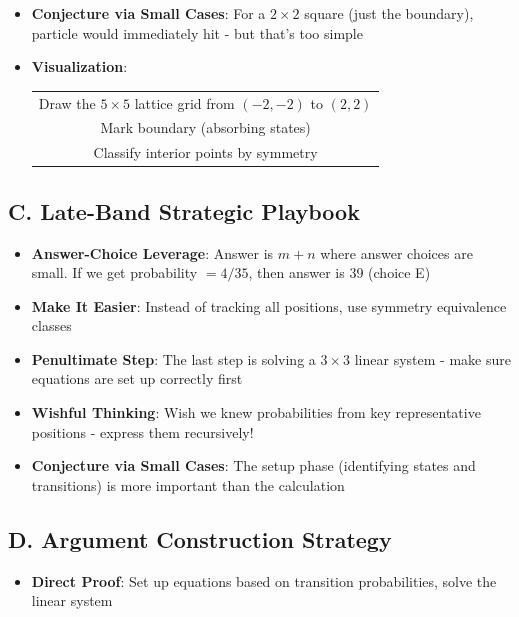 \documentclass[12pt]{article}
\begin{document}
\begin{strategicbox}
\begin{itemize}[leftmargin=*]
    \item \textbf{Conjecture via Small Cases}: For a $2 \times 2$ square (just the boundary), particle would immediately hit - but that's too simple
    
    \item \textbf{Visualization}: 
    \begin{center}
    \begin{tabular}{c}
    Draw the $5 \times 5$ lattice grid from $(-2,-2)$ to $(2,2)$ \\
    Mark boundary (absorbing states) \\
    Classify interior points by symmetry
    \end{tabular}
    \end{center}
\end{itemize}

\subsection*{C. Late-Band Strategic Playbook}
\begin{itemize}[leftmargin=*]
    \item \textbf{Answer-Choice Leverage}: Answer is $m+n$ where answer choices are small. If we get probability $= 4/35$, then answer is 39 (choice E)
    
    \item \textbf{Make It Easier}: Instead of tracking all positions, use symmetry equivalence classes
    
    \item \textbf{Penultimate Step}: The last step is solving a $3 \times 3$ linear system - make sure equations are set up correctly first
    
    \item \textbf{Wishful Thinking}: Wish we knew probabilities from key representative positions - express them recursively!
    
    \item \textbf{Conjecture via Small Cases}: The setup phase (identifying states and transitions) is more important than the calculation
\end{itemize}

\subsection*{D. Argument Construction Strategy}
\begin{itemize}[leftmargin=*]
    \item \textbf{Direct Proof}: Set up equations based on transition probabilities, solve the linear system
    

\end{itemize}
\end{strategicbox}
\end{document}
